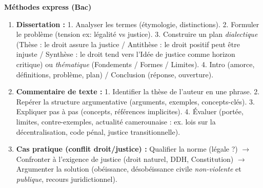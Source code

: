 \documentclass[11pt]{article}
\newcommand{\cle}[1]{{\popxbold\color{popdark}#1}}
\begin{document}
\begin{bilan}
\textbf{Méthodes express (Bac)}
\begin{enumerate}
  \item \textbf{Dissertation :} 1. Analyser les termes (étymologie, distinctions). 2. Formuler le \cle{problème} (tension ex: légalité vs justice). 3. Construire un plan \emph{dialectique} (Thèse : le droit assure la justice / Antithèse : le droit positif peut être injuste / Synthèse : le droit tend vers l'Idée de justice comme horizon critique) ou \emph{thématique} (Fondements / Formes / Limites). 4. Intro (amorce, définitions, problème, plan) / Conclusion (réponse, ouverture).
  \item \textbf{Commentaire de texte :} 1. Identifier \cle{la thèse} de l'auteur en une phrase. 2. Repérer la \cle{structure argumentative} (arguments, exemples, concepts-clés). 3. \cle{Expliquer} pas à pas (concepts, références implicites). 4. \cle{Évaluer} (portée, limites, contre-exemples, actualité camerounaise : ex. lois sur la décentralisation, code pénal, justice transitionnelle).
  \item \textbf{Cas pratique (conflit droit/justice) :} Qualifier la norme (légale ?) $\to$ Confronter à l'exigence de justice (droit naturel, DDH, Constitution) $\to$ Argumenter la solution (obéissance, désobéissance civile \emph{non-violente} et \emph{publique}, recours juridictionnel).
\end{enumerate}
\end{bilan}
\end{document}

